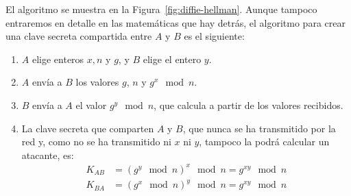 El algoritmo se muestra en la Figura~\ref{fig:diffie-hellman}. Aunque tampoco entraremos en detalle en las matemáticas que hay detrás, el algoritmo para crear una clave secreta compartida entre $A$ y $B$ es el siguiente:
\begin{enumerate}
    \item $A$ elige enteros $x,n$ y $g$, y $B$ elige el entero $y$.
    \item $A$ envía a $B$ los valores $g$, $n$ y $g^x \mod n$.
    \item $B$ envía a $A$ el valor $g^y \mod n$, que calcula a partir de los valores recibidos.
    \item La clave secreta que comparten $A$ y $B$, que nunca se ha transmitido por la red y, como no se ha transmitido ni $x$ ni $y$, tampoco la podrá calcular un atacante, es:
    \begin{align*}
        K_{AB}  &= (g^y \mod n)^x \mod n = g^{xy} \mod n\\
        K_{BA}  &= (g^x \mod n)^y \mod n = g^{xy} \mod n
    \end{align*}
\end{enumerate}
